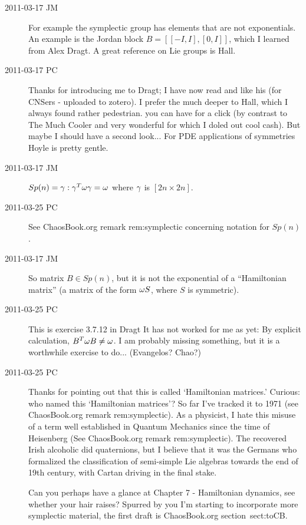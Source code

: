 \begin{description}
\item[2011-03-17 JM]
For example the symplectic group has elements that are not exponentials.
An example is the Jordan block $B=[[-I, I],[0,I]]$, which I learned from
Alex Dragt. A great reference on Lie groups is Hall.

\item[2011-03-17 PC]
Thanks for introducing me to Dragt; I have now read and like his
 (for CNSers - uploaded to zotero). I prefer the much
deeper  to Hall, which I always found rather
pedestrian.  you can have for
a click (by contrast to The Much Cooler and very wonderful
 for which I doled out cool cash). But maybe I should
have a second look... For PDE applications of symmetries
Hoyle is pretty gentle.


\item[2011-03-17 JM]
$Sp(n) = {\gamma :  \gamma^T {\bf \omega} \gamma = {\bf \omega}}$
where $\gamma$ is $[2n\!\times\!2n]$.

\item[2011-03-25 PC]
See ChaosBook.org remark {rem:symplectic}  concerning notation for $Sp(n)$.

\item[2011-03-17 JM]
So matrix $B \in Sp(n)$, but it is not the exponential of a
``Hamiltonian matrix'' (a matrix of the form ${\bf \omega}S$, where $S$
is symmetric).

\item[2011-03-25 PC]
This is exercise 3.7.12 in Dragt
It has not worked for me as yet:
By explicit calculation, $B^T {\bf \omega} B \neq {\bf \omega}$.
I am probably missing something, but it is a worthwhile exercise
to do... (Evangelos? Chao?)

\item[2011-03-25 PC]
Thanks for pointing out that this is called `Hamiltonian matrices.'
Curious: who named this `Hamiltonian matrices'? So far I've tracked it to 1971
(see ChaosBook.org remark {rem:symplectic}).
As a physicist, I hate
this misuse of a term well established in Quantum Mechanics since the
time of Heisenberg (See ChaosBook.org remark {rem:symplectic}). The recovered Irish
alcoholic did quaternions, but I believe that it was the Germans who
formalized the classification of semi-simple Lie algebras towards the end
of 19th century, with Cartan driving in the final stake.

Can you perhaps have a glance at
 {Chapter 7 -
Hamiltonian dynamics}, see whether your hair raises? Spurred by you I'm
starting to incorporate more symplectic material, the first draft is
ChaosBook.org section~{sect:toCB}.


\end{description}
